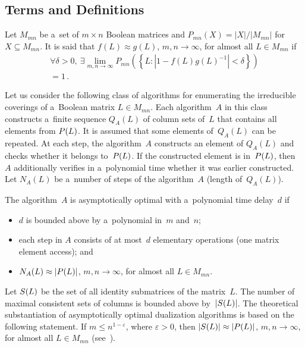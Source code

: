 \begin{multicols}{2}
{}

\section{Terms and Definitions}

\noindent
Let $M_{mn}$ be a~set of $m{\times}n$ Boolean matrices and
$P_{mn}(X) = |X| / |M_{mn}|$ for $X \subseteq M_{mn}$. It is said
that $f(L)\approx g(L)$, $m, n \to \infty$, for almost all $L\in
M_{mn}$ if
\begin{multline*}
\!\!\!\forall \delta>0, \ \exists \lim_{m,n \to \infty} P_{mn} \left(\left\{L \colon
\left |1-f(L)g(L)^{-1} \right|<\delta \right\} \right)\\ = 1\,.
\end{multline*}

Let us consider the following class of algorithms for enumerating
the irreducible coverings of a~Boolean matrix $L\in M_{mn}$. Each
algorithm~$A$ in this class constructs a~finite sequence $Q_A(L)$
of column sets of~$L$ that contains all elements from $P(L)$. It
is assumed that some elements of~$Q_A(L)$ can be repeated. At each
step, the algorithm~$A$ constructs an element of $Q_A(L)$ and
checks whether it belongs to~$P(L)$. If the constructed element
is in~$P(L)$, then~$A$ additionally verifies in a~polynomial
time whether it was earlier constructed. Let $N_A(L)$ be a~number
of steps of the algorithm~$A$ (length of~$Q_A(L)$).
{

}

The algorithm~$A$ is asymptotically optimal with a~polynomial time delay~$d$ if
\begin{itemize}
    \item
    $d$  is bounded above by a~polynomial in~$m$ and~$n$;
    \item
    each step in  $A$ consists of at most~$d$ elementary 
    operations (one matrix element
    access); and
    \item
    $N_A(L)\approx |P(L)|$, $m,n \to \infty$, for almost all $L\in M_{mn}$.
\end{itemize}

Let  $S(L)$ be the set of all identity submatrices of the matrix~$L$. 
The number of maximal consistent sets of columns is bounded
above by~$|S(L)|$. The theoretical substantiation of
asymptotically optimal dualization algorithms is based on the
following statement.
If $m \le n^{1-\varepsilon}$, where $\varepsilon > 0$, then $|S(L)| \approx
|P(L)|$,
$m, n \to \infty$, for almost all $L\in M_{mn}$ (see~\cite{D1977}).


\end{multicols}
